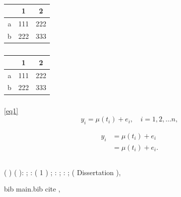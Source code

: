 \documentclass{article}
\begin{document}
\begin{table}[htbp]
\centering
\caption{ }
\label{tab:subtable}
\subcaptionbox{ }
{
\begin{tabular}{c|c|c}
\hline
  &  1 & 2 \\
\hline
a &111 & 222 \\
b &222 & 333 \\
\hline
\end{tabular}
}
\hskip2cm
\subcaptionbox{ }
{
\begin{tabular}{c|c|c}
\hline
  &  1 & 2 \\
\hline
a &111 & 222 \\
b &222 & 333 \\
\hline
\end{tabular}
}
\end{table}


\subsubsection{ }
 
 \eqref{eq1}
\begin{equation}
y_i = \mu(t_i) + e_i, \quad i = 1,2,\dots n,
\label{eq1}
\end{equation}
 
\begin{equation}
  \begin{aligned}
  y_i &= \mu(t_i) + e_i\\
      &= \mu(t_i) + e_i.\\
  \end{aligned}
\end{equation}

\subsubsection{ }
 ( ) 
 ( ):     ;
 :   ( 1 )   ;  :   ;
 :   ; ( Dissertation ),
 \par
 bib main.bib cite \cite{guegan2005can},\citet{guegan2005can} \citet{dahlhaus1997} \cite{guegan2005can,dahlhaus1997} 


\section{ }
\subsection{ }
 

\end{document}
